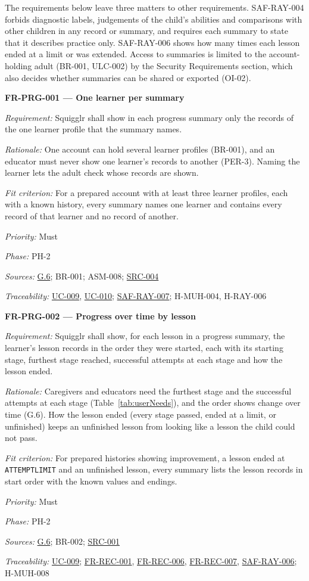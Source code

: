 \documentclass[12pt]{article}
\renewcommand{\_}{\textunderscore\allowbreak}%
\newcommand{\goalref}[1]{\hyperref[goal:#1]{G.#1}}
\newcommand{\ucref}[1]{\hyperref[uc:#1]{\mbox{UC-#1}}}
\newenvironment{srsrequirement}[2]{%
  \par\medskip\noindent\phantomsection\label{req:#1}%
  \textbf{#1 --- #2}\par\nobreak\smallskip }{\par\medskip}
\newcommand{\reqfield}[2]{\noindent\textit{#1:} #2\par}
\newcommand{\reqshall}[1]{\reqfield{Requirement}{#1}}
\newcommand{\reqrationale}[1]{\reqfield{Rationale}{#1}}
\newcommand{\reqfit}[1]{\reqfield{Fit criterion}{#1}}
\newcommand{\reqpriority}[1]{\reqfield{Priority}{#1}}
\newcommand{\reqphase}[1]{\reqfield{Phase}{#1}}
\newcommand{\reqsources}[1]{\reqfield{Sources}{#1}}
\newcommand{\reqtraces}[1]{\reqfield{Traceability}{#1}}
\newcommand{\reqref}[1]{\hyperref[req:#1]{#1}}
\newcommand{\srcref}[1]{\hyperref[src:#1]{SRC-#1}}
\providecommand{\ucref}[1]{\hyperref[uc:#1]{UC-#1}}
\begin{document}
The requirements below leave three matters to other requirements. SAF-RAY-004
forbids diagnostic labels, judgements of the child's abilities and comparisons
with other children in any record or summary, and requires each summary to state
that it describes practice only. SAF-RAY-006 shows how many times each lesson
ended at a limit or was extended. Access to summaries is limited to the
account-holding adult (BR-001, ULC-002) by the Security Requirements section,
which also decides whether summaries can be shared or exported (OI-02).

\begin{srsrequirement}{FR-PRG-001}{One learner per summary}
  \reqshall{Squigglr shall show in each progress summary only the records of the
one learner profile that the summary names.} \reqrationale{One account can hold
several learner profiles (BR-001), and an educator must never show one learner's
records to another (PER-3). Naming the learner lets the adult check whose
records are shown.} \reqfit{For a prepared account with at least three learner
profiles, each with a known history, every summary names one learner and
contains every record of that learner and no record of another.}
  \reqpriority{Must}
  \reqphase{PH-2}
  \reqsources{\goalref{6}; BR-001; ASM-008; \srcref{004}}
  \reqtraces{\ucref{009}, \ucref{010}; \reqref{SAF-RAY-007}; H-MUH-004,
  H-RAY-006}
\end{srsrequirement}

\begin{srsrequirement}{FR-PRG-002}{Progress over time by lesson}
  \reqshall{Squigglr shall show, for each lesson in a progress summary, the
learner's lesson records in the order they were started, each with its starting
stage, furthest stage reached, successful attempts at each stage and how the
lesson ended.} \reqrationale{Caregivers and educators need the furthest stage
and the successful attempts at each stage (Table~\ref{tab:userNeeds}), and the
order shows change over time (G.6). How the lesson ended (every stage passed,
ended at a limit, or unfinished) keeps an unfinished lesson from looking like a
lesson the child could not pass.} \reqfit{For prepared histories showing
improvement, a lesson ended at \texttt{ATTEMPT\_\allowbreak LIMIT} and an
unfinished lesson, every summary lists the lesson records in start order with
the known values and endings.}
  \reqpriority{Must}
  \reqphase{PH-2}
  \reqsources{\goalref{6}; BR-002; \srcref{001}} \reqtraces{\ucref{009};
  \reqref{FR-REC-001}, \reqref{FR-REC-006}, \reqref{FR-REC-007},
  \reqref{SAF-RAY-006}; H-MUH-008}
\end{srsrequirement}
\end{document}

